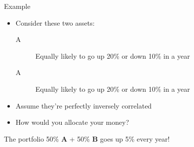\documentclass[16pt,aspectratio=169]{beamer}
\begin{document}
\begin{frame}{Example}
    \begin{itemize}
        \item Consider these two assets:
              \begin{description}
                  \item[A] Equally likely to go up 20\% or down 10\% in a year
                  \item[A] Equally likely to go up 20\% or down 10\% in a year
              \end{description}
        \item Assume they're perfectly inversely correlated
        \item How would you allocate your money?
    \end{itemize}
    \pause
    \begin{center}
        \large%
        The portfolio 50\% \textbf{A} + 50\% \textbf{B} goes up 5\% every year!
    \end{center}
\end{frame}
\end{document}
